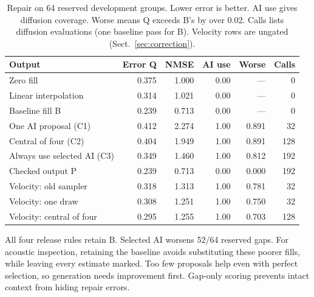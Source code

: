 \documentclass[runningheads,orivec]{llncs}
\begin{document}
\begin{table}[htbp]
\caption{Repair on 64 reserved development groups. Lower error is better. AI use gives diffusion coverage. Worse means Q exceeds B's by over 0.02. Calls lists diffusion evaluations (one baseline pass for B). Velocity rows are ungated (Sect.~\ref{sec:correction}).}
\label{tab:2}
\centering\small
\begin{tabular*}{\linewidth}{@{\extracolsep{\fill}}lrrrrr@{}}
\toprule

\textbf{Output} & \textbf{Error Q} & \textbf{NMSE} & \textbf{AI use} & \textbf{Worse} & \textbf{Calls} \\

\midrule

Zero fill & 0.375 & 1.000 & 0.00 & --- & 0 \\

Linear interpolation & 0.314 & 1.021 & 0.00 & --- & 0 \\

Baseline fill B & 0.239 & 0.713 & 0.00 & --- & 0 \\

One AI proposal (C1) & 0.412 & 2.274 & 1.00 & 0.891 & 32 \\

Central of four (C2) & 0.404 & 1.949 & 1.00 & 0.891 & 128 \\

Always use selected AI (C3) & 0.349 & 1.460 & 1.00 & 0.812 & 192 \\

Checked output P & 0.239 & 0.713 & 0.00 & 0.000 & 192 \\

\midrule

Velocity: old sampler & 0.318 & 1.313 & 1.00 & 0.781 & 32 \\

Velocity: one draw & 0.308 & 1.251 & 1.00 & 0.750 & 32 \\

Velocity: central of four & 0.295 & 1.255 & 1.00 & 0.703 & 128 \\

\bottomrule
\end{tabular*}
\end{table}

All four release rules retain B. Selected AI worsens 52/64 reserved gaps. For acoustic inspection, retaining the baseline avoids substituting these poorer fills, while leaving every estimate marked. Too few proposals help even with perfect selection, so generation needs improvement first. Gap-only scoring prevents intact context from hiding repair errors.
\end{document}
